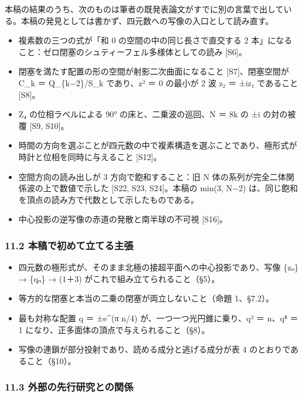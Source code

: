 \documentclass[
  a4paper,
]{ltjsarticle}
\providecommand{\tightlist}{%
  \setlength{\itemsep}{0pt}\setlength{\parskip}{0pt}}
\begin{document}
本稿の結果のうち、次のものは筆者の既発表論文がすでに別の言葉で出している。本稿の発見としては書かず、四元数への写像の入口として読み直す。

\begin{itemize}
\tightlist
\item
  複素数の三つの式が「和 0 の空間の中の同じ長さで直交する 2
  本」になること：ゼロ閉塞のシュティーフェル多様体としての読み
  {[}S6{]}。
\item
  閉塞を満たす配置の形の空間が射影二次曲面になること
  {[}S7{]}、閉塞空間が C\_k ＝ Q\_\{k−2\}/S\_k であり、z² ＝ 0 の最小が
  2 波 z₂ ＝ ±iz₁ であること {[}S8{]}。
\item
  Z₄ の位相ラベルによる 90° の床と、二乗波の巡回、N ＝ 8k の ±i
  の対の被覆 {[}S9, S10{]}。
\item
  時間の方向を選ぶことが四元数の中で複素構造を選ぶことであり、極形式が時計と位相を同時に与えること
  {[}S12{]}。
\item
  空間方向の読み出しが 3 方向で飽和すること：旧 N
  体の系列が完全二体関係波の上で数値で示した {[}S22, S23, S24{]}。本稿の
  min(3, N−2) は、同じ飽和を頂点の読み方で代数として示したものである。
\item
  中心投影の逆写像の赤道の発散と南半球の不可視 {[}S16{]}。
\end{itemize}

\subsubsection{11.2
本稿で初めて立てる主張}\label{ux672cux7a3fux3067ux521dux3081ux3066ux7acbux3066ux308bux4e3bux5f35}

\begin{itemize}
\tightlist
\item
  四元数の極形式が、そのまま北極の接超平面への中心投影であり、写像
  \{zₙ\} → \{qₙ\} → (1＋3) がこれで組み立てられること（§5）。
\item
  等方的な閉塞と本当の二乗の閉塞が両立しないこと（命題 1、§7.2）。
\item
  最も対称な配置 q ＝ ±e\^{}(π n/4) が、一つ一つ光円錐に乗り、q² ＝
  n、q⁸ ＝ 1 になり、正多面体の頂点で与えられること（§8）。
\item
  写像の連鎖が部分投射であり、読める成分と逃げる成分が表 4
  のとおりであること（§10）。
\end{itemize}

\subsubsection{11.3
外部の先行研究との関係}\label{ux5916ux90e8ux306eux5148ux884cux7814ux7a76ux3068ux306eux95a2ux4fc2}
\end{document}
